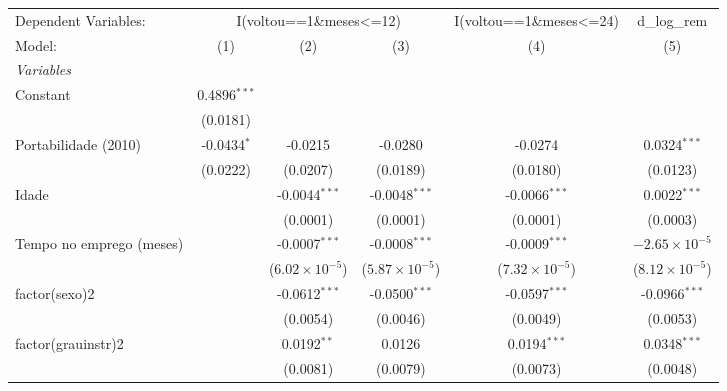 
\begingroup
\centering
\begin{tabular}{lccccc}
   \tabularnewline \midrule \midrule
   Dependent Variables: & \multicolumn{3}{c}{I(voltou==1\&meses<=12)} & I(voltou==1\&meses<=24) & d\_log\_rem\\
   Model:                   & (1)            & (2)                     & (3)                     & (4)                     & (5)\\  
   \midrule
   \emph{Variables}\\
   Constant                 & 0.4896$^{***}$ &                         &                         &                         &   \\   
                            & (0.0181)       &                         &                         &                         &   \\   
   Portabilidade (2010)     & -0.0434$^{*}$  & -0.0215                 & -0.0280                 & -0.0274                 & 0.0324$^{***}$\\   
                            & (0.0222)       & (0.0207)                & (0.0189)                & (0.0180)                & (0.0123)\\   
   Idade                    &                & -0.0044$^{***}$         & -0.0048$^{***}$         & -0.0066$^{***}$         & 0.0022$^{***}$\\   
                            &                & (0.0001)                & (0.0001)                & (0.0001)                & (0.0003)\\   
   Tempo no emprego (meses) &                & -0.0007$^{***}$         & -0.0008$^{***}$         & -0.0009$^{***}$         & $-2.65\times 10^{-5}$\\    
                            &                & ($6.02\times 10^{-5}$)  & ($5.87\times 10^{-5}$)  & ($7.32\times 10^{-5}$)  & ($8.12\times 10^{-5}$)\\    
   factor(sexo)2            &                & -0.0612$^{***}$         & -0.0500$^{***}$         & -0.0597$^{***}$         & -0.0966$^{***}$\\   
                            &                & (0.0054)                & (0.0046)                & (0.0049)                & (0.0053)\\   
   factor(grauinstr)2       &                & 0.0192$^{**}$           & 0.0126                  & 0.0194$^{***}$          & 0.0348$^{***}$\\   
                            &                & (0.0081)                & (0.0079)                & (0.0073)                & (0.0048)\\   

\end{tabular}
